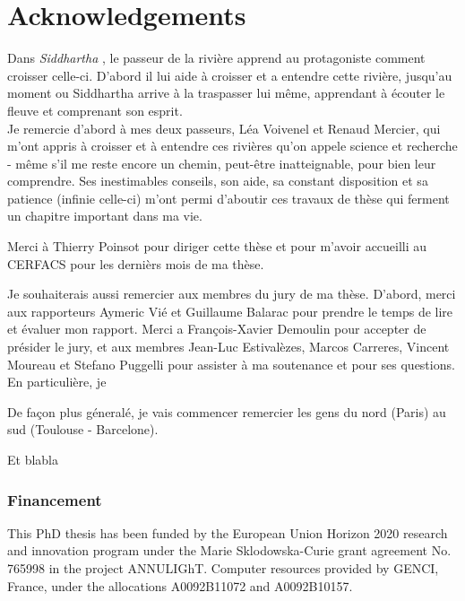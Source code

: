 \chapter*{Acknowledgements}
    
Dans \textsl{Siddhartha} , le passeur de la rivière apprend au protagoniste comment croisser celle-ci. D'abord il lui aide à croisser et a entendre cette rivière, jusqu'au moment ou Siddhartha arrive à la traspasser lui même, apprendant à écouter le fleuve et comprenant son esprit. \\  %
%
Je remercie d'abord à mes deux passeurs, Léa Voivenel et Renaud Mercier, qui m'ont appris à croisser et à entendre ces rivières qu'on appele science et recherche - même s'il me reste encore un chemin, peut-être inatteignable, pour bien leur comprendre. Ses inestimables conseils, son aide, sa constant disposition et sa patience (infinie celle-ci) m'ont permi d'aboutir ces travaux de thèse qui ferment un chapitre important dans ma vie. 

Merci à Thierry Poinsot pour diriger cette thèse et pour m'avoir accueilli au CERFACS pour les dernièrs mois de ma thèse.  

Je souhaiterais aussi remercier aux membres du jury de ma thèse. D'abord, merci aux rapporteurs Aymeric Vié et Guillaume Balarac pour prendre le temps de lire et évaluer mon rapport. Merci a François-Xavier Demoulin pour accepter de présider le jury, et aux membres Jean-Luc Estivalèzes, Marcos Carreres, Vincent Moureau et Stefano Puggelli pour assister à ma soutenance et pour ses questions. En particulière, je 

De façon plus géneralé, je vais commencer remercier les gens du nord (Paris) au sud (Toulouse - Barcelone).

Et blabla

\subsection*{Financement}

This PhD thesis has been funded by the European Union Horizon 2020 research and innovation program under the Marie Sklodowska-Curie grant agreement No. 765998 in the project ANNULIGhT. Computer resources provided by GENCI, France, under the allocations A0092B11072 and A0092B10157.

